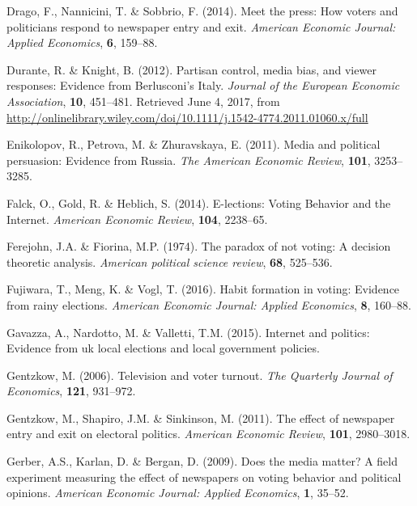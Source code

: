 \documentclass[
  12pt,
]{article}
\begin{document}
\leavevmode\hypertarget{ref-drago_meet_2014}{}%
Drago, F., Nannicini, T. \& Sobbrio, F. (2014). Meet the press: How
voters and politicians respond to newspaper entry and exit.
\emph{American Economic Journal: Applied Economics}, \textbf{6},
159--88.

\leavevmode\hypertarget{ref-durante_partisan_2012}{}%
Durante, R. \& Knight, B. (2012). Partisan control, media bias, and
viewer responses: Evidence from Berlusconi's Italy. \emph{Journal of the
European Economic Association}, \textbf{10}, 451--481. Retrieved June 4,
2017, from
\url{http://onlinelibrary.wiley.com/doi/10.1111/j.1542-4774.2011.01060.x/full}

\leavevmode\hypertarget{ref-enikolopov_media_2011}{}%
Enikolopov, R., Petrova, M. \& Zhuravskaya, E. (2011). Media and
political persuasion: Evidence from Russia. \emph{The American Economic
Review}, \textbf{101}, 3253--3285.

\leavevmode\hypertarget{ref-falck_e-lections:_2014}{}%
Falck, O., Gold, R. \& Heblich, S. (2014). E-lections: Voting Behavior
and the Internet. \emph{American Economic Review}, \textbf{104},
2238--65.

\leavevmode\hypertarget{ref-ferejohn_paradox_1974}{}%
Ferejohn, J.A. \& Fiorina, M.P. (1974). The paradox of not voting: A
decision theoretic analysis. \emph{American political science review},
\textbf{68}, 525--536.

\leavevmode\hypertarget{ref-fujiwara_habit_2016}{}%
Fujiwara, T., Meng, K. \& Vogl, T. (2016). Habit formation in voting:
Evidence from rainy elections. \emph{American Economic Journal: Applied
Economics}, \textbf{8}, 160--88.

\leavevmode\hypertarget{ref-gavazza_internet_2015}{}%
Gavazza, A., Nardotto, M. \& Valletti, T.M. (2015). Internet and
politics: Evidence from uk local elections and local government
policies.

\leavevmode\hypertarget{ref-gentzkow_television_2006}{}%
Gentzkow, M. (2006). Television and voter turnout. \emph{The Quarterly
Journal of Economics}, \textbf{121}, 931--972.

\leavevmode\hypertarget{ref-gentzkow_effect_2011}{}%
Gentzkow, M., Shapiro, J.M. \& Sinkinson, M. (2011). The effect of
newspaper entry and exit on electoral politics. \emph{American Economic
Review}, \textbf{101}, 2980--3018.

\leavevmode\hypertarget{ref-gerber_does_2009}{}%
Gerber, A.S., Karlan, D. \& Bergan, D. (2009). Does the media matter? A
field experiment measuring the effect of newspapers on voting behavior
and political opinions. \emph{American Economic Journal: Applied
Economics}, \textbf{1}, 35--52.
\end{document}
